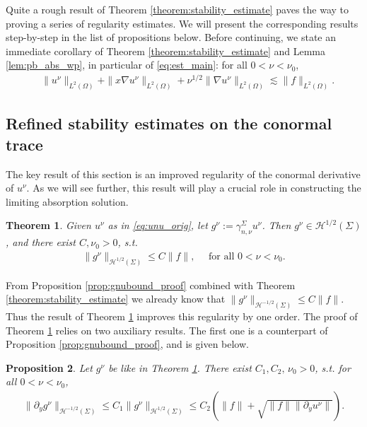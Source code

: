 \documentclass[report]{elsarticle}
\newtheorem{theorem}{Theorem}[section]
\newtheorem{proposition}[theorem]{Proposition}
\numberwithin{theorem}{section}
\begin{document}
Quite a rough result of Theorem \ref{theorem:stability_estimate} paves the way to proving a series of regularity estimates. We will present the corresponding results step-by-step in the list of propositions below. Before continuing, we state an immediate corollary of Theorem \ref{theorem:stability_estimate} and Lemma \ref{lem:pb_abs_wp}, in particular of \eqref{eq:est_main}: for all $0<\nu<\nu_0$, 
\begin{align}
	\label{eq:est_main_v2}
	&\|u^{\nu}\|_{L^2(\Omega)}+\|x\nabla u^{\nu}\|_{L^2(\Omega)}+\nu^{1/2}\|\nabla u^{\nu}\|_{L^2(\Omega)}\lesssim \|f\|_{L^2(\Omega)}.
\end{align}
\subsection{Refined stability estimates on the conormal trace}
The key result of this section is an improved regularity of the conormal derivative of $u^{\nu}$. As we will see further, this result will play a crucial role in constructing the limiting absorption solution.
\begin{theorem}
	\label{theorem:gnubound_improved}
	Given $u^{\nu}$ as in \eqref{eq:unu_orig}, let $g^{\nu}:=\gamma_{n, \nu}^{\Sigma}u^{\nu}$. Then $g^{\nu}\in \mathcal{H}^{1/2}(\Sigma)$, and there exist $C, \nu_0>0$, s.t. 
	\begin{align}
		\label{eq:gnubound_key}
		\|g^{\nu}\|_{\mathcal{H}^{1/2}(\Sigma)}\leq C\|f\|, \quad \text{ for all }0<\nu<\nu_0.
	\end{align}
\end{theorem}
From Proposition \ref{prop:gnubound_proof} combined with Theorem \ref{theorem:stability_estimate} we already know that $
\|g^{\nu}\|_{\mathcal{H}^{-1/2}(\Sigma)}\leq C\|f\|.	$
Thus the result of Theorem \ref{theorem:gnubound_improved} improves this regularity by one order. The proof of Theorem \ref{theorem:gnubound_improved} relies on two auxiliary results. The first one is a counterpart of Proposition \ref{prop:gnubound_proof}, and is given below.  
\begin{proposition}
	\label{prop:gnubound_improved}
	Let $g^{\nu}$ be like in Theorem \ref{theorem:gnubound_improved}. There exist $C_1, C_2, \, \nu_0>0$, s.t. for all $0<\nu<\nu_0$,
	\begin{align}
		\label{eq:gnubound_improved}
		\|\partial_y g^{\nu}\|_{\mathcal{H}^{-1/2}(\Sigma)}\leq C_1 
		\|g^{\nu}\|_{\mathcal{H}^{1/2}(\Sigma)}\leq C_2\left(\|f\|+\sqrt{\|f\|\|\partial_y u^{\nu}\|}\right).
	\end{align}
\end{proposition}
\end{document}

